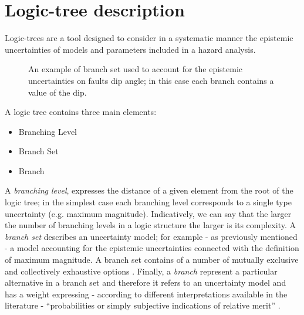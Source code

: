%
\section{Logic-tree description}
\label{hazard:logic_tree}
Logic-trees are a tool designed to consider in a systematic manner the 
epistemic uncertainties of models and parameters included in a hazard 
analysis.
\renewcommand{\psedge}{\ncdiag[armA=0,angleB=180,armB=1cm]}
\begin{figure}[!hb]

\caption{An example of branch set used to account for the epistemic 
uncertainties on faults dip angle; in this case each branch contains a value 
of the dip.}
\label{fig:logic_tree_branching_levels}
\end{figure}

A logic tree cont\-ains three main elements:
\begin{itemize}
\item Branching Level
\item Branch Set
\item Branch
\end{itemize}
%
A \emph{branching level}, expresses the distance of a given element from the 
root of the logic tree; in the simplest case each branching level corresponds 
to a single type uncertainty (e.g. maximum magnitude). 
Indicatively, we can say that the larger the number of branching levels in a 
logic structure the larger is its complexity.
%
A \emph{branch set} describes an uncertainty model; for example - as previously 
mentioned - a model accounting for the epistemic uncertainties connected with 
the definition of maximum magnitude. A branch set contains of a number of 
mutually exclusive and collectively exhaustive options \citep{bommer2008}. 
%
Finally, a \emph{branch} represent a particular alternative in a branch set and 
therefore it refers to an uncertainty model and has a weight expressing - 
according to different interpretations available in the literature 
- ``probabilities or simply subjective indications of relative merit'' 
\citep[][page 999]{bommer2008}.

